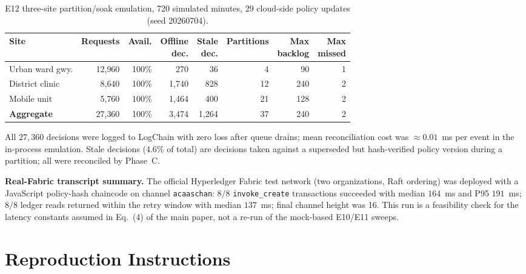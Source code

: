 \documentclass[runningheads]{llncs}
\begin{document}
\begin{table}[h]
\centering
\caption{E12 three-site partition/soak emulation, 720 simulated minutes, 29 cloud-side policy updates (seed 20260704).}
\label{tab:s-soak}
\footnotesize
\setlength{\tabcolsep}{4pt}
\begin{tabular}{lrrrrrrr}
\toprule
\textbf{Site} & \textbf{Requests} & \textbf{Avail.} & \shortstack[r]{\textbf{Offline}\\\textbf{dec.}} & \shortstack[r]{\textbf{Stale}\\\textbf{dec.}} & \textbf{Partitions} & \shortstack[r]{\textbf{Max}\\\textbf{backlog}} & \shortstack[r]{\textbf{Max}\\\textbf{missed}} \\
\midrule
Urban ward gwy. & 12{,}960 & 100\% & 270   & 36  & 4  & 90  & 1 \\
District clinic & 8{,}640  & 100\% & 1{,}740 & 828 & 12 & 240 & 2 \\
Mobile unit     & 5{,}760  & 100\% & 1{,}464 & 400 & 21 & 128 & 2 \\
\midrule
\textbf{Aggregate} & 27{,}360 & 100\% & 3{,}474 & 1{,}264 & 37 & 240 & 2 \\
\bottomrule
\end{tabular}
\end{table}

\noindent All $27{,}360$ decisions were logged to LogChain with zero loss after queue drains; mean reconciliation cost was $\approx 0.01$~ms per event in the in-process emulation. Stale decisions ($4.6\%$ of total) are decisions taken against a superseded but hash-verified policy version during a partition; all were reconciled by Phase~C.

\smallskip\noindent\textbf{Real-Fabric transcript summary.}
The official Hyperledger Fabric test network (two organizations, Raft ordering) was deployed with a JavaScript policy-hash chaincode on channel \texttt{acaaschan}: $8/8$ \texttt{invoke\_create} transactions succeeded with median $164$~ms and P95 $191$~ms; $8/8$ ledger reads returned within the retry window with median $137$~ms; final channel height was 16. This run is a feasibility check for the latency constants assumed in Eq.~(4) of the main paper, not a re-run of the mock-based E10/E11 sweeps.

\section{Reproduction Instructions}
\label{s:repro}
\end{document}
